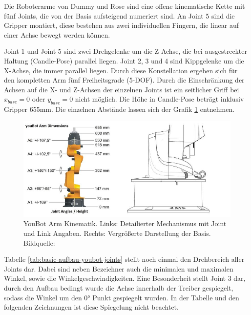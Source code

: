  Die Roboterarme von Dummy und Rose sind eine offene kinematische Kette mit fünf Joints, die von der Basis aufsteigend numeriert sind. An Joint 5 sind die Gripper montiert, diese bestehen aus zwei individuellen Fingern, die linear auf einer Achse bewegt werden können.

Joint 1 und Joint 5 sind zwei Drehgelenke um die Z-Achse, die bei ausgestreckter Haltung (Candle-Pose) parallel liegen. Joint 2, 3 und 4 sind Kippgelenke um die X-Achse, die immer parallel liegen. Durch diese Konstellation ergeben sich für den kompletten Arm fünf Freiheitsgrade (5-DOF). Durch die Einschränkung der Achsen auf die X- und Z-Achsen der einzelnen Joints ist ein seitlicher Griff bei $x_{base} = 0$ oder $y_{base} = 0$ nicht möglich. Die Höhe in Candle-Pose beträgt inklusiv Gripper 655mm. Die einzelnen Abstände lassen sich der Grafik \ref{fig:basic-aufbau-youbot-kinematik} entnehmen.

\begin{figure}[H]
	\centering
	\includegraphics[scale=0.8]{fig/kukaarm_1}   
	\caption[YouBot Arm Kinematik]{YouBot Arm Kinematik. Links: Detailierter Mechanismus mit Joint und Link Angaben. Rechts: Vergrößerte Darstellung der Basis. Bildquelle: \cite{monikaflorekjasinska2015}}
	\label{fig:basic-aufbau-youbot-kinematik}
\end{figure}



 
 Tabelle \ref{tab:basic-aufbau-youbot-joints} stellt noch einmal den Drehbereich aller Joints dar. Dabei sind neben Bezeichner auch die minimalen und maximalen Winkel, sowie die Winkelgeschwindigkeiten. Eine Besonderheit stellt Joint 3 dar, durch den Aufbau bedingt wurde die Achse innerhalb der Treiber gespiegelt, sodass die Winkel um den 0° Punkt gespiegelt wurden. In der Tabelle und den folgenden Zeichnungen ist diese Spiegelung nicht beachtet.
 
